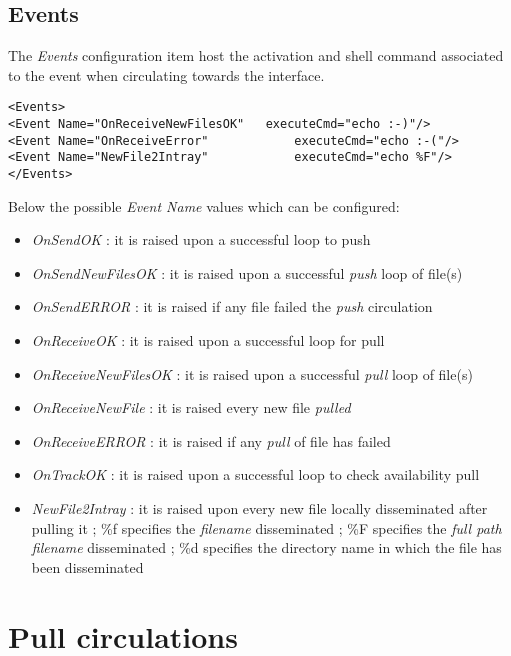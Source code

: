 \documentclass[dec_sum_main.tex]{subfiles}
\begin{document}
\subsection{Events}
The \textit{Events} configuration item host the activation and shell command associated to the event when circulating towards the interface.
\begin{lstlisting}
<Events>
<Event Name="OnReceiveNewFilesOK"  	executeCmd="echo :-)"/>
<Event Name="OnReceiveError"            executeCmd="echo :-("/>
<Event Name="NewFile2Intray"            executeCmd="echo %F"/>
</Events>
\end{lstlisting}
\par
\par
\noindent
Below the possible \textit{Event Name} values which can be configured:
\begin{itemize}
	\item \textit{OnSendOK} : it is raised upon a successful loop to push
	\item \textit{OnSendNewFilesOK} : it is raised upon a successful \textit{push} loop of file(s)
	\item \textit{OnSendERROR} : it is raised if any file failed the \textit{push} circulation 
	\item \textit{OnReceiveOK} : it is raised upon a successful loop for pull
	\item \textit{OnReceiveNewFilesOK} : it is raised upon a successful \textit{pull} loop of file(s)
	\item \textit{OnReceiveNewFile} : it is raised every new file \textit{pulled}
	\item \textit{OnReceiveERROR} : it is raised if any \textit{pull} of file has failed
	\item \textit{OnTrackOK} : it is raised upon a successful loop to check availability pull
	\item \textit{NewFile2Intray} :	it is raised upon every new file locally disseminated after pulling it ; \%f specifies the \textit{filename} disseminated ; \%F specifies the \textit{full path filename} disseminated ; \%d specifies the directory name in which the file has been disseminated 					 
\end{itemize}


\section{Pull circulations}
\end{document}
